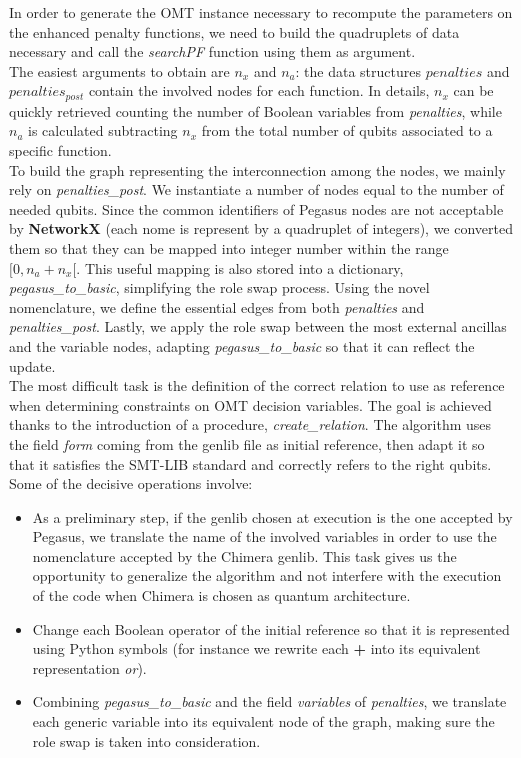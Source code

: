 In order to generate the OMT instance necessary to recompute the parameters on the enhanced penalty functions, we need to build the quadruplets of data necessary and call the \textit{searchPF} function using them as argument.\\
The easiest arguments to obtain are $n_x$ and $n_a$: the data structures $penalties$ and $penalties_{post}$ contain the involved nodes for each function. In details, $n_x$ can be quickly retrieved counting the number of Boolean variables from \textit{penalties}, while $n_a$ is calculated subtracting $n_x$ from the total number of qubits associated to a specific function. \\
To build the graph representing the interconnection among the nodes, we mainly rely on \textit{penalties\_post}. We instantiate a number of nodes equal to the number of needed qubits. Since the common identifiers of Pegasus nodes are not acceptable by \textbf{NetworkX} (each nome is represent by a quadruplet of integers), we converted them so that they can be mapped into integer number within the range $[0, n_a + n_x[$. This useful mapping is also stored into a dictionary, \textit{pegasus\_to\_basic}, simplifying the role swap process. Using the novel nomenclature, we define the essential edges from both \textit{penalties} and \textit{penalties\_post}. Lastly, we apply the role swap between the most external ancillas and the variable nodes, adapting \textit{pegasus\_to\_basic} so that it can reflect the update. \\
The most difficult task is the definition of the correct relation to use as reference when determining constraints on OMT decision variables. The goal is achieved thanks to the introduction of a procedure, \textit{create\_relation}. The algorithm uses the field \textit{form} coming from the genlib file as initial reference, then adapt it so that it satisfies the SMT-LIB standard and correctly refers to the right qubits. Some of the decisive operations involve:

\begin{itemize}
    \item As a preliminary step, if the genlib chosen at execution is the one accepted by Pegasus, we translate the name of the involved variables in order to use the nomenclature accepted by the Chimera genlib. This task gives us the opportunity to generalize the algorithm and not interfere with the execution of the code when Chimera is chosen as quantum architecture.
    \item Change each Boolean operator of the initial reference so that it is represented using Python symbols (for instance we rewrite each \textbf{+} into its equivalent representation \textit{or}).
    \item Combining \textit{pegasus\_to\_basic} and the field \textit{variables} of \textit{penalties}, we translate each generic variable into its equivalent node of the graph, making sure the role swap is taken into consideration.
\end{itemize}

